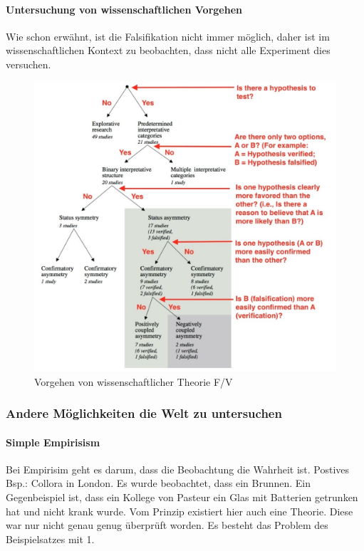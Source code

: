 \paragraph{Untersuchung von wissenschaftlichen Vorgehen}
Wie schon erwähnt, ist die Falsifikation nicht immer möglich, daher ist im wissenschaftlichen Kontext zu beobachten, dass nicht alle Experiment dies versuchen.
\begin{figure}[H]
	\centering
	\includegraphics[scale = 0.2]{attachment/chapter_13/Scc078}
	\caption{Vorgehen von wissenschaftlicher Theorie F/V} 
\end{figure}







\subsubsection{Andere Möglichkeiten die Welt zu untersuchen}
\paragraph{Simple Empirisism}
Bei Empirisim geht es darum, dass die Beobachtung die Wahrheit ist. Postives Bsp.: Collora in London. Es wurde beobachtet, dass ein Brunnen. Ein Gegenbeispiel ist, dass ein Kollege von Pasteur ein Glas mit Batterien getrunken hat und nicht krank wurde. Vom Prinzip existiert hier auch eine Theorie. Diese war nur nicht genau genug überprüft worden. Es besteht das Problem des Beispielsatzes mit 1.

